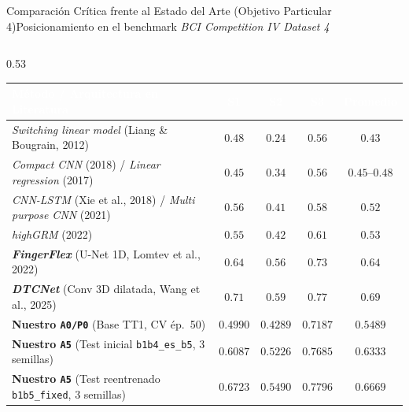 \begin{frame}{Comparaci\'on Cr\'itica frente al Estado del Arte (Objetivo Particular 4)}{Posicionamiento en el benchmark \textit{BCI Competition IV Dataset 4} \cite{liang2012decoding,Lomtev2022,wang2025dtcnet,rodas_valencia_tpe_ecog}}
  \begin{columns}[T,onlytextwidth]
    \begin{column}{0.53\textwidth}
      \centering
      \tiny
      \renewcommand{\arraystretch}{1.18}
      \setlength{\tabcolsep}{3pt}
      \begin{tabular}{@{} l c c c c @{}}
        \toprule
        \rowcolor{ipnDark}
        \textcolor{white}{\textbf{M\'etodo / Arquitectura en Literatura}} &
        \textcolor{white}{\textbf{S1}} &
        \textcolor{white}{\textbf{S2}} &
        \textcolor{white}{\textbf{S3}} &
        \textcolor{white}{\textbf{Promedio}} \\
        \midrule
        \textit{Switching linear model} (Liang \& Bougrain, 2012) \cite{liang2012decoding} & $0.48$ & $0.24$ & $0.56$ & $0.43$ \\
        \rowcolor{rowLight}
        \textit{Compact CNN} (2018) / \textit{Linear regression} (2017) & $0.45$ & $0.34$ & $0.56$ & $0.45\text{--}0.48$ \\
        \textit{CNN-LSTM} (Xie et al., 2018) / \textit{Multi purpose CNN} (2021) & $0.56$ & $0.41$ & $0.58$ & $0.52$ \\
        \rowcolor{rowLight}
        \textit{highGRM} (2022) & $0.55$ & $0.42$ & $0.61$ & $0.53$ \\
        \midrule
        \textbf{\textit{FingerFlex}} (U-Net 1D, Lomtev et al., 2022) \cite{Lomtev2022} & $0.64$ & $0.56$ & $0.73$ & $\mathbf{0.64}$ \\
        \rowcolor{rowLight}
        \textbf{\textit{DTCNet}} (Conv 3D dilatada, Wang et al., 2025) \cite{wang2025dtcnet} & $0.71$ & $0.59$ & $0.77$ & $\mathbf{0.69}$ \\
        \midrule
        \textbf{Nuestro \texttt{A0/P0}} (Base TT1, CV \'ep.\ 50) & $0.4990$ & $0.4289$ & $0.7187$ & $0.5489$ \\
        \rowcolor{rowLight}
        \textbf{Nuestro \texttt{A5}} (Test inicial \texttt{b1b4\_es\_b5}, 3 semillas) & $0.6087$ & $0.5226$ & $0.7685$ & $\mathbf{0.6333}$ \\
        \rowcolor{rowHighlight}
        \textbf{Nuestro \texttt{A5}} (Test reentrenado \texttt{b1b5\_fixed}, 3 semillas) & $\mathbf{0.6723}$ & $\mathbf{0.5490}$ & $\mathbf{0.7796}$ & $\mathbf{0.6669}$ \\
        \bottomrule
      \end{tabular}
    \end{column}


\end{columns}
\end{frame}
